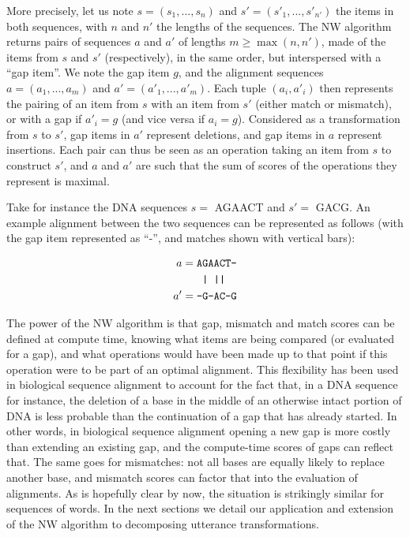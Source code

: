 More precisely, let us note \(s = (s_1, ..., s_n)\) and
\(s' = (s'_1, ..., s'_{n'})\) the items in both sequences, with \(n\)
and \(n'\) the lengths of the sequences. The NW algorithm returns pairs
of sequences \(a\) and \(a'\) of lengths \(m \geq \max(n, n')\), made of
the items from \(s\) and \(s'\) (respectively), in the same order, but
interspersed with a \enquote{gap item}. We note the gap item \(g\), and
the alignment sequences \(a = (a_1, ..., a_m)\) and
\(a' = (a'_1, ..., a'_m)\). Each tuple \((a_i, a'_i)\) then represents
the pairing of an item from \(s\) with an item from \(s'\) (either match
or mismatch), or with a gap if \(a'_i = g\) (and vice versa if
\(a_i = g\)). Considered as a transformation from \(s\) to \(s'\), gap
items in \(a'\) represent deletions, and gap items in \(a\) represent
insertions. Each pair can thus be seen as an operation taking an item
from \(s\) to construct \(s'\), and \(a\) and \(a'\) are such that the
sum of scores of the operations they represent is maximal.

Take for instance the DNA sequences \(s =\) AGAACT and \(s' =\) GACG. An
example alignment between the two sequences can be represented as
follows (with the gap item represented as \enquote{-}, and matches shown
with vertical bars):

\begin{align*}
  a  = {} & \text{\texttt{AGAACT-}} \\
       {} & \text{\texttt{  | ||}} \\
  a' = {} & \text{\texttt{-G-AC-G}}
\end{align*}

The power of the NW algorithm is that gap, mismatch and match scores can
be defined at compute time, knowing what items are being compared (or
evaluated for a gap), and what operations would have been made up to
that point if this operation were to be part of an optimal alignment.
This flexibility has been used in biological sequence alignment to
account for the fact that, in a DNA sequence for instance, the deletion
of a base in the middle of an otherwise intact portion of DNA is less
probable than the continuation of a gap that has already started. In
other words, in biological sequence alignment opening a new gap is more
costly than extending an existing gap, and the compute-time scores of
gaps can reflect that. The same goes for mismatches: not all bases are
equally likely to replace another base, and mismatch scores can factor
that into the evaluation of alignments. As is hopefully clear by now,
the situation is strikingly similar for sequences of words. In the next
sections we detail our application and extension of the NW algorithm to
decomposing utterance transformations.

